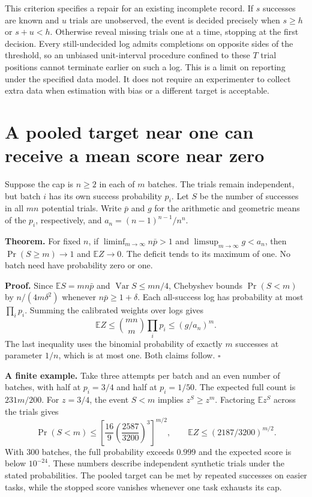 \documentclass[11pt]{article}
\begin{document}
This criterion specifies a repair for an existing incomplete record. If $s$ successes are known and $u$ trials are unobserved, the event is decided precisely when $s\ge h$ or $s+u<h$. Otherwise reveal missing trials one at a time, stopping at the first decision. Every still-undecided log admits completions on opposite sides of the threshold, so an unbiased unit-interval procedure confined to these $T$ trial positions cannot terminate earlier on such a log. This is a limit on reporting under the specified data model. It does not require an experimenter to collect extra data when estimation with bias or a different target is acceptable.

\newpage
\section*{A pooled target near one can receive a mean score near zero}
Suppose the cap is $n\ge2$ in each of $m$ batches. The trials remain independent, but batch $i$ has its own success probability $p_i$. Let $S$ be the number of successes in all $mn$ potential trials. Write $\bar p$ and $g$ for the arithmetic and geometric means of the $p_i$, respectively, and $a_n=(n-1)^{n-1}/n^n$.

\textbf{Theorem.} For fixed $n$, if $\liminf_{m\to\infty} n\bar p>1$ and $\limsup_{m\to\infty}g<a_n$, then $\Pr(S\ge m)\to1$ and $\mathbb E Z\to0$. The deficit tends to its maximum of one. No batch need have probability zero or one.

\textbf{Proof.} Since $\mathbb E S=mn\bar p$ and $\operatorname{Var}S\le mn/4$, Chebyshev bounds $\Pr(S<m)$ by $n/(4m\delta^2)$ whenever $n\bar p\ge1+\delta$. Each all-success log has probability at most $\prod_i p_i$. Summing the calibrated weights over logs gives
\[
\mathbb E Z\le\binom{mn}{m}\prod_i p_i\le(g/a_n)^m .
\]
The last inequality uses the binomial probability of exactly $m$ successes at parameter $1/n$, which is at most one. Both claims follow. \hfill$\square$

\textbf{A finite example.} Take three attempts per batch and an even number of batches, with half at $p_i=3/4$ and half at $p_i=1/50$. The expected full count is $231m/200$. For $z=3/4$, the event $S<m$ implies $z^S\ge z^m$. Factoring $\mathbb E z^S$ across the trials gives
\[
\Pr(S<m)\le\left[\frac{16}{9}\left(\frac{2587}{3200}\right)^3\right]^{m/2},
\qquad \mathbb E Z\le(2187/3200)^{m/2}.
\]
With 300 batches, the full probability exceeds $0.999$ and the expected score is below $10^{-24}$. These numbers describe independent synthetic trials under the stated probabilities. The pooled target can be met by repeated successes on easier tasks, while the stopped score vanishes whenever one task exhausts its cap.
\end{document}

